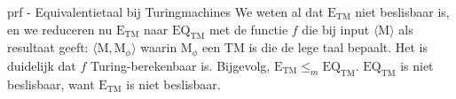 \begin{prf}{prf - Equivalentietaal bij Turingmachines}
    We weten al dat $\text{E}_{\text{TM}}$ niet beslisbaar is, en we reduceren nu $\text{E}_{\text{TM}}$ naar $\text{EQ}_{\text{TM}}$ met de functie $f$ die bij input $\langle \text{M} \rangle$ als resultaat geeft: $\langle \text{M}, \text{M}_{\phi} \rangle$ waarin $ \text{M}_{\phi}$ een TM is die de lege taal bepaalt. Het is duidelijk dat $f$ Turing-berekenbaar is. Bijgevolg, $\text{E}_{\text{TM}} \leq_m \text{EQ}_{\text{TM}}$. $\text{EQ}_{\text{TM}}$ is niet beslisbaar, want $\text{E}_{\text{TM}}$ is niet beslisbaar.
\end{prf}

